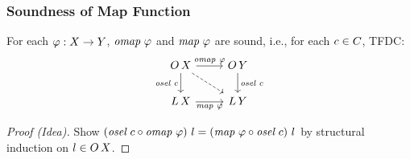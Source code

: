 \documentclass[draft,notes=show,xcolor=dvipsnames]{beamer}
\begin{document}
\begin{frame}[fragile]
  \frametitle{Soundness of Map Function}
  \begin{theorem}
    For each $\varphi : X \to Y$, \alert<2>{$\omap\ \varphi$} and \alert<2>{$\textit{map}\ \varphi$} are sound, i.e., for each $c \in C$, TFDC:
    $$
      \begin{tikzcd}
        \OLst \ar[d, "\osel\ \cE"'] \ar[r, "\omap\ \varphi"] \ar[dr, dashed] &
        \OLst[\ValY] \ar[d, "\osel\ \cE"] \\
        \Lst \ar[r, "\lmap\ \varphi"'] &
        \Lst[\ValY]
      \end{tikzcd}
    $$
  \end{theorem}
  \begin{proof}[Proof (Idea)]
    Show
    $
      (\textit{osel}\ c \circ \textit{omap}\ \varphi)\ l =
      (\textit{map}\ \varphi \circ \textit{osel}\ c)\ l
    $
    by structural induction on $l \in O\,{X}$.
  \end{proof}
\end{frame}
\end{document}
